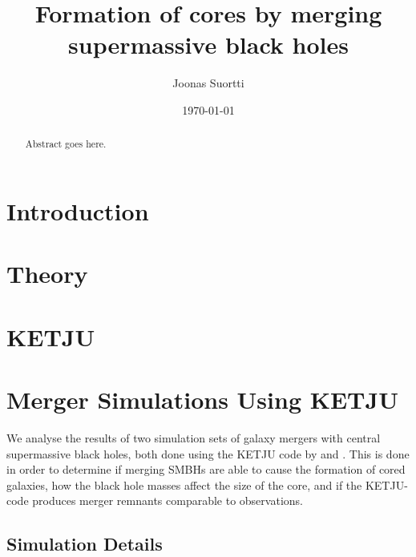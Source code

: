 \documentclass[english, oneside]{HYgradu}
\title{Formation of cores by merging supermassive black holes}
\author{Joonas Suortti}
\date{\today}
\begin{document}
\maketitle

\begin{abstract}
Abstract goes here.
\end{abstract}

\mytableofcontents



\chapter{Introduction}

\chapter{Theory}

\chapter{KETJU}

\chapter{Merger Simulations Using KETJU}

We analyse the results of two simulation sets of galaxy mergers with central supermassive black holes, both done using the KETJU code by \cite{Mannerkoski2019} and \cite{Rantala2018}. This is done in order to determine if merging SMBHs are able to cause the formation of cored galaxies, how the black hole masses affect the size of the core, and if the KETJU-code produces merger remnants comparable to observations. 

\section{Simulation Details}
\end{document}
